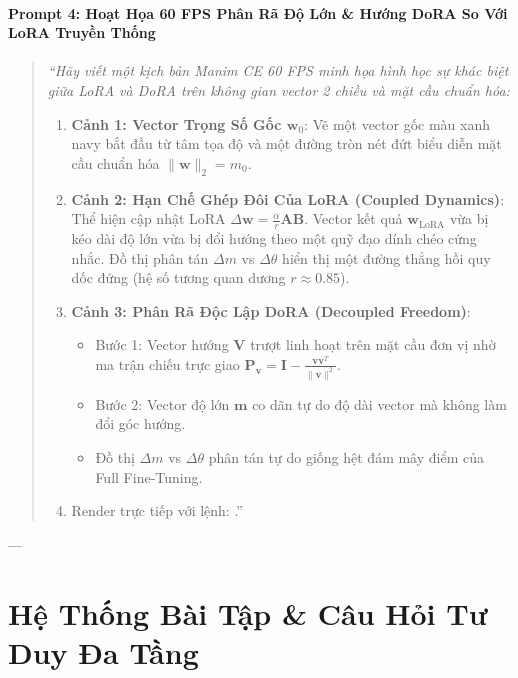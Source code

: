 \begin{simulationbox}
\paragraph{Prompt 4: Hoạt Họa 60 FPS Phân Rã Độ Lớn \& Hướng DoRA So Với LoRA Truyền Thống}
\begin{quote}\small\itshape
``Hãy viết một kịch bản Manim CE 60 FPS minh họa hình học sự khác biệt giữa LoRA và DoRA trên không gian vector 2 chiều và mặt cầu chuẩn hóa:
\begin{enumerate}
  \item \textbf{Cảnh 1: Vector Trọng Số Gốc $\mathbf{w}_0$}: Vẽ một vector gốc màu xanh navy bắt đầu từ tâm tọa độ và một đường tròn nét đứt biểu diễn mặt cầu chuẩn hóa $\|\mathbf{w}\|_2 = m_0$.
  \item \textbf{Cảnh 2: Hạn Chế Ghép Đôi Của LoRA (Coupled Dynamics)}: Thể hiện cập nhật LoRA $\Delta \mathbf{w} = \frac{\alpha}{r}\mathbf{A}\mathbf{B}$. Vector kết quả $\mathbf{w}_{\text{LoRA}}$ vừa bị kéo dài độ lớn vừa bị đổi hướng theo một quỹ đạo dính chéo cứng nhắc. Đồ thị phân tán $\Delta m$ vs $\Delta \theta$ hiển thị một đường thẳng hồi quy dốc đứng (hệ số tương quan dương $r \approx 0.85$).
  \item \textbf{Cảnh 3: Phân Rã Độc Lập DoRA (Decoupled Freedom)}:
  \begin{itemize}
    \item Bước 1: Vector hướng $\mathbf{V}$ trượt linh hoạt trên mặt cầu đơn vị nhờ ma trận chiếu trực giao $\mathbf{P}_{\mathbf{v}} = \mathbf{I} - \frac{\mathbf{v}\mathbf{v}^T}{\|\mathbf{v}\|^2}$.
    \item Bước 2: Vector độ lớn $\mathbf{m}$ co dãn tự do độ dài vector mà không làm đổi góc hướng.
    \item Đồ thị $\Delta m$ vs $\Delta \theta$ phân tán tự do giống hệt đám mây điểm của Full Fine-Tuning.
  \end{itemize}
  \item Render trực tiếp với lệnh: .''
\end{enumerate}
\end{quote}
\end{simulationbox}

---

\section{Hệ Thống Bài Tập \& Câu Hỏi Tư Duy Đa Tầng}
\label{sec:ch11-exercises}

